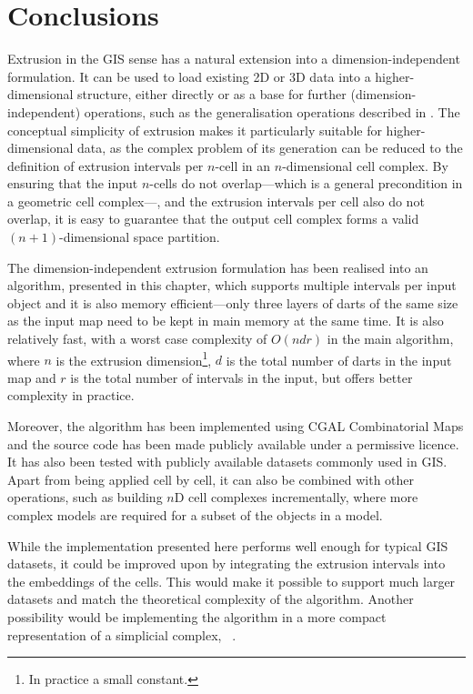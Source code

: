 \section{Conclusions}
\label{se:extrusion-conclusions}

Extrusion in the GIS sense has a natural extension into a dimension-independent formulation.
It can be used to load existing 2D or 3D data into a higher-dimensional structure, either directly or as a base for further (dimension-independent) operations, such as the generalisation operations described in .
The conceptual simplicity of extrusion makes it particularly suitable for higher-dimensional data, as the complex problem of its generation can be reduced to the definition of extrusion intervals per $n$-cell in an $n$-dimensional cell complex.
By ensuring that the input $n$-cells do not overlap---which is a general precondition in a geometric cell complex---, and the extrusion intervals per cell also do not overlap, it is easy to guarantee that the output cell complex forms a valid $(n+1)$-dimensional space partition.

The dimension-independent extrusion formulation has been realised into an algorithm, presented in this chapter, which supports multiple intervals per input object and it is also memory efficient---only three layers of darts of the same size as the input map need to be kept in main memory at the same time.
It is also relatively fast, with a worst case complexity of $O(ndr)$ in the main algorithm, where $n$ is the extrusion dimension\footnote{In practice a small constant.}, $d$ is the total number of darts in the input map and $r$ is the total number of intervals in the input, but offers better complexity in practice.

Moreover, the algorithm has been implemented using CGAL Combinatorial Maps and the source code has been made publicly available under a permissive licence.
It has also been tested with publicly available datasets commonly used in GIS.\@
Apart from being applied cell by cell, it can also be combined with other operations, such as building $n$D cell complexes incrementally, where more complex models are required for a subset of the objects in a model.

While the implementation presented here performs well enough for typical GIS datasets, it could be improved upon by integrating the extrusion intervals into the embeddings of the cells.
This would make it possible to support much larger datasets and match the theoretical complexity of the algorithm.
Another possibility would be implementing the algorithm in a more compact representation of a simplicial complex, \eg\ \citet{Boissonnat12}.
